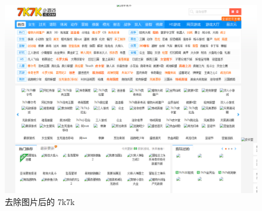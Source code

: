 \documentclass[UTF8]{article}
\begin{document}
\begin{figure}[H]
	\centering
	\includegraphics[width=\linewidth/3*2]{7k7k_ad.png}
	\caption{去除图片后的 7k7k}
\end{figure}\par
\end{document}

